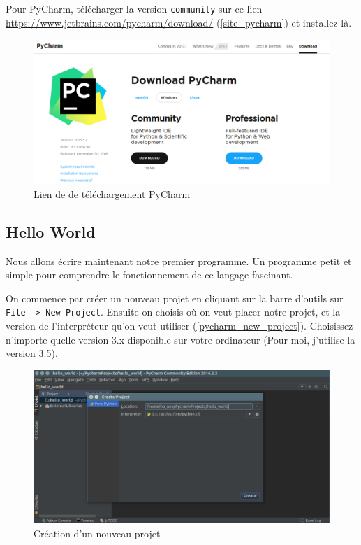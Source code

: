 \documentclass[12pt]{article}
\newcommand{\code}[1]{\colorbox{light-gray}{\texttt{#1}}}
\begin{document}
            Pour PyCharm, télécharger la version \code{community} sur ce lien \href{https://www.jetbrains.com/pycharm/download/}{https://www.jetbrains.com/pycharm/download/} (\autoref{site_pycharm}) et installez là.

            \begin{figure}[H]
                \centering
                \includegraphics[width=\linewidth]{img/8_pycharm_download.png}
                \caption{Lien de de téléchargement PyCharm}
                \label{site_pycharm}
            \end{figure}

\clearpage

    \subsection{Hello World}
        Nous allons écrire maintenant notre premier programme. Un programme petit et simple pour comprendre le 
        fonctionnement de ce langage fascinant.

        On commence par créer un nouveau projet en cliquant sur la barre d'outils sur \code{File -> New Project}. Ensuite on choisis où on veut placer notre projet, et la version de l'interpréteur qu'on veut utiliser
        (\autoref{pycharm_new_project}). Choisissez n'importe quelle version 3.x disponible sur votre ordinateur
        (Pour moi, j'utilise la version 3.5).

        \begin{figure}[H]
            \centering
            \includegraphics[width=\linewidth]{img/9_new_project.png}
            \caption{Création d'un nouveau projet}
            \label{pycharm_new_project}
        \end{figure}
\end{document}
